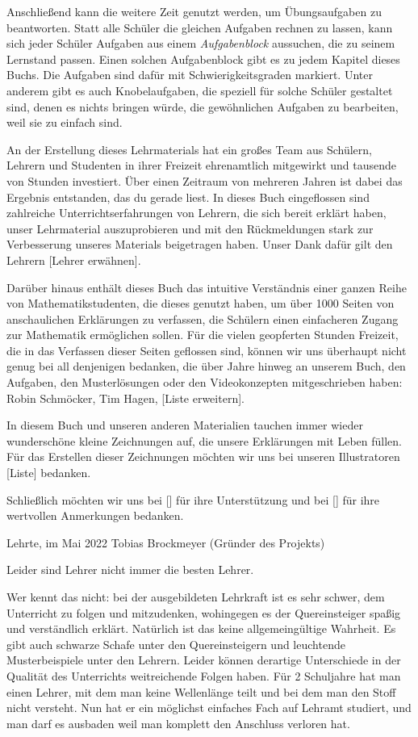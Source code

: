 \documentclass[../main.tex]{subfiles}
\begin{document}
Anschließend kann die weitere Zeit genutzt werden, um Übungsaufgaben zu beantworten. Statt alle Schüler die gleichen Aufgaben rechnen zu lassen, kann sich jeder Schüler Aufgaben aus einem \emph{Aufgabenblock} aussuchen, die zu seinem Lernstand passen. Einen solchen Aufgabenblock gibt es zu jedem Kapitel dieses Buchs. Die Aufgaben sind dafür mit Schwierigkeitsgraden markiert. Unter anderem gibt es auch Knobelaufgaben, die speziell für solche Schüler gestaltet sind, denen es nichts bringen würde, die gewöhnlichen Aufgaben zu bearbeiten, weil sie zu einfach sind.

An der Erstellung dieses Lehrmaterials hat ein großes Team aus Schülern, Lehrern und Studenten in ihrer Freizeit ehrenamtlich mitgewirkt und tausende von Stunden investiert. Über einen Zeitraum von mehreren Jahren ist dabei das Ergebnis entstanden, das du gerade liest. 
In dieses Buch eingeflossen sind zahlreiche Unterrichtserfahrungen von Lehrern, die sich bereit erklärt haben, unser Lehrmaterial auszuprobieren und mit den Rückmeldungen stark zur Verbesserung unseres Materials beigetragen haben. Unser Dank dafür gilt den Lehrern [Lehrer erwähnen].

Darüber hinaus enthält dieses Buch das intuitive Verständnis einer ganzen Reihe von Mathematikstudenten, die dieses genutzt haben, um über 1000 Seiten von anschaulichen Erklärungen zu verfassen, die Schülern einen einfacheren Zugang zur Mathematik ermöglichen sollen. 
Für die vielen geopferten Stunden Freizeit, die in das Verfassen dieser Seiten geflossen sind, können wir uns überhaupt nicht genug bei all denjenigen bedanken, die über Jahre hinweg an unserem Buch, den Aufgaben, den Musterlösungen oder den Videokonzepten mitgeschrieben haben: Robin Schmöcker, Tim Hagen, [Liste erweitern].

In diesem Buch und unseren anderen Materialien tauchen immer wieder wunderschöne kleine Zeichnungen auf, die unsere Erklärungen mit Leben füllen. Für das Erstellen dieser Zeichnungen möchten wir uns bei unseren Illustratoren [Liste] bedanken.

Schließlich möchten wir uns bei [] für ihre Unterstützung und bei [] für ihre wertvollen Anmerkungen bedanken.

Lehrte, im Mai 2022 \hfill Tobias Brockmeyer (Gründer des Projekts)

Leider sind Lehrer nicht immer die besten Lehrer.

Wer kennt das nicht: bei der ausgebildeten Lehrkraft ist es sehr schwer, dem Unterricht zu folgen und mitzudenken, wohingegen es der Quereinsteiger spaßig und verständlich erklärt. Natürlich ist das keine allgemeingültige Wahrheit. Es gibt auch schwarze Schafe unter den Quereinsteigern und leuchtende Musterbeispiele unter den Lehrern. Leider können derartige Unterschiede in der Qualität des Unterrichts weitreichende Folgen haben. Für 2 Schuljahre hat man einen Lehrer, mit dem man keine Wellenlänge teilt und bei dem man den Stoff nicht versteht. Nun hat er ein möglichst einfaches Fach auf Lehramt studiert, und man darf es ausbaden weil man komplett den Anschluss verloren hat.
\end{document}
